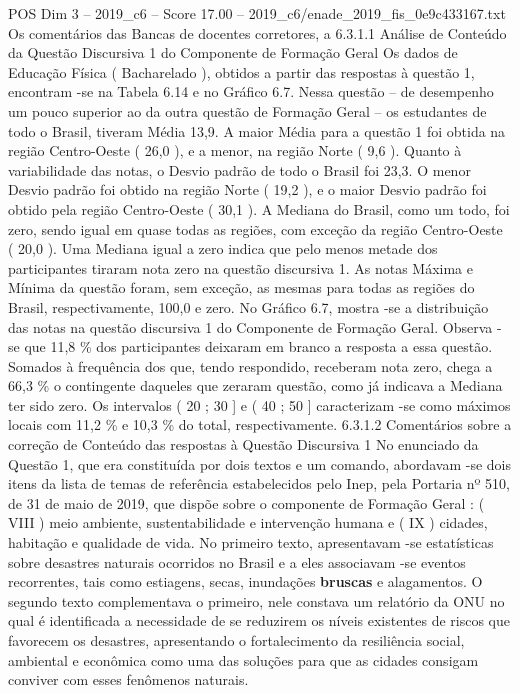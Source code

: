 \begin{textsample}{POS Dim 3 – 2019\_c6 – Score 17.00 – 2019\_c6/enade\_2019\_fis\_0e9c433167.txt}
Os comentários das Bancas de docentes corretores, a 6.3.1.1 Análise de Conteúdo da Questão Discursiva 1 do Componente de Formação Geral Os dados de Educação Física ( Bacharelado ), obtidos a partir das respostas à questão 1, encontram -se na Tabela 6.14 e no Gráfico 6.7.
Nessa questão – de desempenho um pouco superior ao da outra questão de Formação Geral – os estudantes de todo o Brasil, tiveram Média 13,9.
A maior Média para a questão 1 foi obtida na região Centro-Oeste ( 26,0 ), e a menor, na região Norte ( 9,6 ).
Quanto à variabilidade das notas, o Desvio padrão de todo o Brasil foi 23,3.
O menor Desvio padrão foi obtido na região Norte ( 19,2 ), e o maior Desvio padrão foi obtido pela região Centro-Oeste ( 30,1 ).
A Mediana do Brasil, como um todo, foi zero, sendo igual em quase todas as regiões, com exceção da região Centro-Oeste ( 20,0 ).
Uma Mediana igual a zero indica que pelo menos metade dos participantes tiraram nota zero na questão discursiva 1.
As notas Máxima e Mínima da questão foram, sem exceção, as mesmas para todas as regiões do Brasil, respectivamente, 100,0 e zero.
No Gráfico 6.7, mostra -se a distribuição das notas na questão discursiva 1 do Componente de Formação Geral.
Observa -se que 11,8 \% dos participantes deixaram em branco a resposta a essa questão.
Somados à frequência dos que, tendo respondido, receberam nota zero, chega a 66,3 \% o contingente daqueles que zeraram questão, como já indicava a Mediana ter sido zero.
Os intervalos ( 20 ; 30 ] e ( 40 ; 50 ] caracterizam -se como máximos locais com 11,2 \% e 10,3 \% do total, respectivamente. 6.3.1.2 Comentários sobre a correção de Conteúdo das respostas à Questão Discursiva 1 No enunciado da Questão 1, que era constituída por dois textos e um comando, abordavam -se dois itens da lista de temas de referência estabelecidos pelo Inep, pela Portaria nº 510, de 31 de maio de 2019, que dispõe sobre o componente de Formação Geral : ( VIII ) meio ambiente, sustentabilidade e intervenção humana e ( IX ) cidades, habitação e qualidade de vida.
No primeiro texto, apresentavam -se estatísticas sobre desastres naturais ocorridos no Brasil e a eles associavam -se eventos recorrentes, tais como estiagens, secas, inundações \textbf{bruscas} e alagamentos.
O segundo texto complementava o primeiro, nele constava um relatório da ONU no qual é identificada a necessidade de se reduzirem os níveis existentes de riscos que favorecem os desastres, apresentando o fortalecimento da resiliência social, ambiental e econômica como uma das soluções para que as cidades consigam conviver com esses fenômenos naturais.

\end{textsample}
